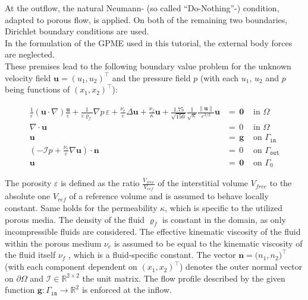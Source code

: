 \documentclass{article}
\newcommand{\norm}[1]{\lVert#1\rVert}
\newcommand{\vect}[1]{\mathbf{#1}}
\newcommand{\bol}[1]{\boldsymbol{#1}}
\begin{document}
\vspace*{10pt}
At the outflow, the natural Neumann- (so called ``Do-Nothing''-) condition, adapted to porous flow, is applied. On both of the remaining two boundaries, Dirichlet boundary conditions are used.\\
In the formulation of the GPME used in this tutorial, the external body forces are neglected.\\
These premises lead to the following boundary value problem for the unknown velocity field $\vect u=(u_1,u_2)^\top$ and the pressure field $p$ (with each $u_1$, $u_2$ and $p$ being functions of $(x_1,x_2)^\top$):

\begin{subequations}
 \begin{eqnarray}
\!\!\!\!\!\!\!\!\!\!\!\!\!\!\!\!\!\!\frac{1}{\varepsilon} \left(\vect u \cdot \nabla \right) \frac{\vect u}{\varepsilon}  + \frac{1}{\varepsilon {\varrho_f}} {\nabla p \, \varepsilon} + \frac{{\nu_e}}{\varepsilon} \Delta \vect u  + \frac{\nu_f }{\kappa}\vect u + \frac{1.75}{\sqrt{150}} \frac{1}{\sqrt{\kappa}} \frac{\norm{\vect u}}{\varepsilon^{3/2}}\vect u &=\, \vect 0 &\text{  in $\Omega$} \label{eqn:red1}\\
    \nabla \cdot \vect u&=\,0 &\text{  in $\Omega$} \label{eqn:red2}\\
    \vect u &=\, \vect g &\text{  on $\Gamma_{\texttt{in}}$} \label{eqn:bound1}\\
   (- \bol{\mathcal{I}}p + \frac{\nu_e}{\varepsilon}\nabla \vect u)\cdot \vect n &= \,0 &\text{  on $\Gamma_{\texttt{out}}$}\label{eqn:bound2}\\
  \vect u &=\,\vect 0 &\text{  on $\Gamma_0$}\label{eqn:bound3}
 \end{eqnarray}
\label{eqn:boundaryreduced}
\end{subequations}

The porosity $\varepsilon$ is defined as the ratio $\frac{V_{free}}{V_{ref}}$ of the interstitial volume $V_{free}$ to the absolute one $V_{ref}$ of a reference volume and is assumed to behave locally constant. Same holds for the permeability $\kappa$, which is specific to the utilized porous media. The density of the fluid ${\varrho_f}$ is constant in the domain, as only incompressible fluids are considered. The effective kinematic viscosity of the fluid within the porous medium $\nu_e$ is assumed to be equal to the kinematic viscosity of the fluid itself $\nu_f$ \cite[p. 356]{Viscosity}, which is a fluid-specific constant. The vector $\vect n=\vect (n_1,n_2)^{\top}$ (with each component dependent on $(x_1,x_2)^{\top}$) denotes the outer normal vector on $\partial \Omega$ and $\boldsymbol{\mathcal{I}} \in \mathbb{R} ^ {2 \times 2}$ the unit matrix. The flow profile described by the given function $\vect g:\Gamma_{\texttt{in}} \rightarrow \mathbb{R}^2$ is enforced at the inflow.
\end{document}
